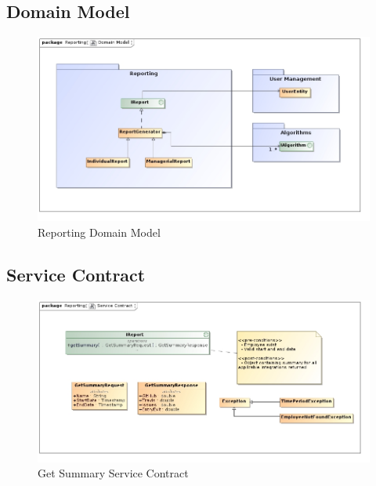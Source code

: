 \documentclass[11pt,a4paper]{article}
\begin{document}
\subsection{Domain Model}
\begin{figure}[H]
	\begin{center}
		\includegraphics[scale=0.5]{../Images/Reporting Domain Model.jpg}
		\caption{Reporting Domain Model}
	\end{center}
\end{figure}



\subsection{Service Contract}
\begin{figure}[H]
	\begin{center}
		\includegraphics[scale=0.5]{../Images/GetSummary Service Contract.jpg}
		\caption{Get Summary Service Contract}
	\end{center}
\end{figure}
\end{document}
